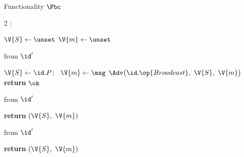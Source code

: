 \begin{interface}[nofloat]{Functionality $\Fbc$ \\
\params{$\PID$, \quad $\Ps$, \quad $\admits$, \quad
$\uses := \{(\Adv,\serves)\}$, \quad $\pars := \none$}}

{\scriptsize
\setlength{\columnsep}{1.4em}
\begin{multicols}{2}
:
\begin{algorithmic}[1]
\setcounter{contline}{0}\algcont
\State $\V{S} \gets \unset$
\State $\V{m} \gets \unset$
\algsave
\end{algorithmic}
\vspace{1.4ex}

 \quad from $\id'$
\begin{algorithmic}[1]
\algcont
{} \label{ln:bconce}
\State $\V{S} \gets \id.P$; \ $\V{m} \gets \msg$ \label{ln:bcfix}
\State $\Adv\bigl(\id.\op{Broadcast},\ \V{S},\ \V{m}\bigr)$ \label{ln:bcleak}
\State \textbf{return} $\ok$
\algsave
\end{algorithmic}
\vspace{1.4ex}

\columnbreak

 \quad from $\id'$
\begin{algorithmic}[1]
\algcont
{}
\State \textbf{return} $(\V{S},\ \V{m})$ \label{ln:bcagree}
\algsave
\end{algorithmic}
\vspace{1.4ex}

 \quad from $\id'$
\begin{algorithmic}[1]
\algcont
\State \textbf{return} $(\V{S},\ \V{m})$
\algsave
\end{algorithmic}
\end{multicols}}
\end{interface}
